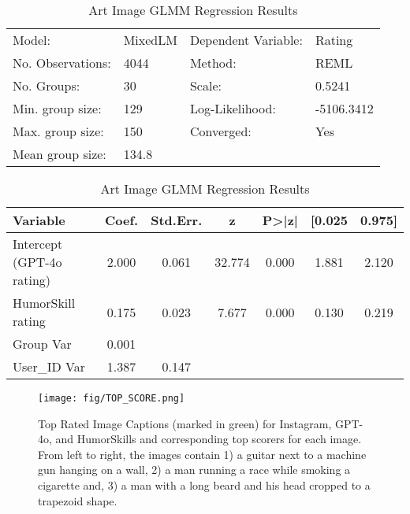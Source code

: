\begin{table}
\caption{Art Image GLMM Regression Results}
\label{glmm_art}
\begin{tabular}{llll}
\hline
Model:            & MixedLM & Dependent Variable: & Rating       \\
No. Observations: & 4044    & Method:             & REML         \\
No. Groups:       & 30      & Scale:              & 0.5241       \\
Min. group size:  & 129     & Log-Likelihood:     & -5106.3412   \\
Max. group size:  & 150     & Converged:          & Yes          \\
Mean group size:  & 134.8   &                     &              \\
\hline
\end{tabular}

\vspace{0.5cm}


\begin{tabular}{lcccccc}
\hline
\textbf{Variable} & \textbf{Coef.} & \textbf{Std.Err.} & \textbf{z} & \textbf{P>|z|} & \textbf{[0.025} & \textbf{0.975]} \\
\hline
Intercept (GPT-4o rating)      & 2.000  & 0.061  & 32.774 & 0.000 & 1.881 & 2.120 \\
HumorSkill rating   & 0.175  & 0.023  & 7.677  & 0.000 & 0.130 & 0.219 \\
Group Var      & 0.001  &        &        &       &       &       \\
User\_ID Var   & 1.387  & 0.147  &        &       &       &       \\
\hline
\end{tabular}
\end{table}

\begin{figure}
    \centering
    \texttt{[image: fig/TOP\_SCORE.png]}
    \caption{Top Rated Image Captions (marked in green) for Instagram, GPT-4o, and HumorSkills and corresponding top scorers for each image. From left to right, the images contain 1) a guitar next to a machine gun hanging on a wall, 2) a man running a race while smoking a cigarette and, 3) a man with a long beard and his head cropped to a trapezoid shape.}
    \label{top_score}
\end{figure}



